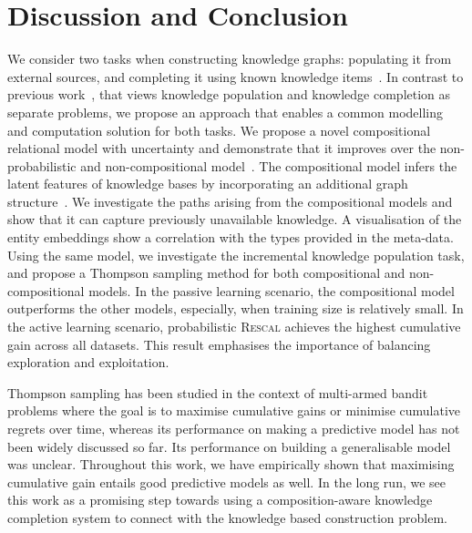 \section{Discussion and Conclusion}
We consider two tasks when constructing knowledge graphs:
populating it from external sources,
and completing it using known knowledge items~\cite{dong2014knowledge}.
In contrast to previous work~\cite{kajino2015active}, that
views knowledge population and knowledge completion as separate problems,
we propose an approach that enables a common modelling and computation solution
for both tasks.
We propose a novel compositional relational model with uncertainty and
demonstrate that it improves over the non-probabilistic and non-compositional
model~\cite{nickel2011three}.
The compositional model infers the latent features of knowledge
bases by incorporating an additional graph structure~\cite{guu2015traversing}.
We investigate the paths arising from the compositional
models and show that it can capture previously unavailable knowledge. A visualisation
of the entity embeddings show a correlation with the types provided in the meta-data.
Using the same model, we investigate the incremental knowledge population task, and propose
a Thompson sampling method for both compositional and non-compositional models.
In the passive learning scenario, the compositional model outperforms the other models,
especially, when training size is relatively small.
In the active learning scenario, probabilistic \textsc{Rescal} achieves the highest
cumulative gain across all datasets. This result emphasises the
importance of balancing exploration and exploitation.

Thompson sampling has been studied in the context of multi-armed bandit
problems where the goal is to maximise cumulative gains or minimise cumulative
regrets over time, whereas its performance on making a predictive model has not
been widely discussed so far. Its performance on building a generalisable model
was unclear. Throughout this work, we have empirically shown that maximising
cumulative gain entails good predictive models as well.
In the long run, we see this work as a promising step towards using a composition-aware knowledge
completion system to connect with the
knowledge based construction problem. %
